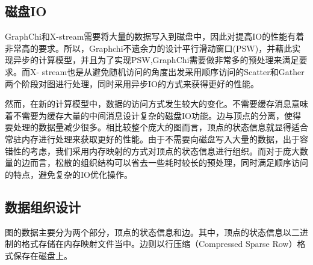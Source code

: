 \subsection{磁盘IO}
GraphChi和X-stream需要将大量的数据写入到磁盘中，因此对提高IO的性能有着非常高的要求。所以，Graphchi不遗余力的设计平行滑动窗口(PSW)，并藉此实现异步的计算模型，并且为了实现PSW,GraphChi需要做非常多的预处理来满足要求。而X- stream也是从避免随机访问的角度出发采用顺序访问的Scatter和Gather两个阶段对图进行处理，同时采用异步IO的方式来获得更好的性能。

然而，在新的计算模型中，数据的访问方式发生较大的变化。不需要缓存消息意味着不需要为缓存大量的中间消息设计复杂的磁盘IO功能。边与顶点的分离，使得要处理的数据量减少很多。相比较整个庞大的图而言，顶点的状态信息就显得适合常驻内存进行处理来获取更好的性能。由于不需要向磁盘写入大量的数据，出于容错性的考虑，我们采用内存映射的方式对顶点的状态信息进行组织。而对于庞大数量的边而言，松散的组织结构可以省去一些耗时较长的预处理，同时满足顺序访问的特点，避免复杂的IO优化操作。

\subsection{数据组织设计}
图的数据主要分为两个部分，顶点的状态信息和边。其中，顶点的状态信息以二进制的格式存储在内存映射文件当中。边则以行压缩（Compressed Sparse Row）格式保存在磁盘上。

